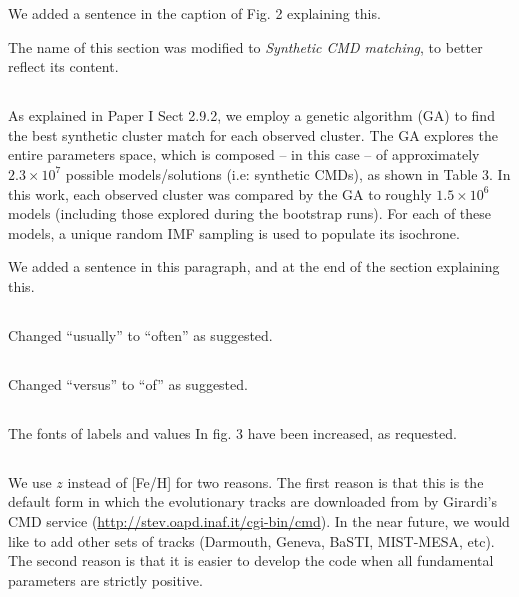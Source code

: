 \documentclass{article}
\begin{document}
We added a sentence in the caption of Fig. 2 explaining this.

The name of this section was modified to \emph{Synthetic CMD matching}, to
better reflect its content.

\subsection{}
As explained in Paper I Sect 2.9.2, we employ a genetic algorithm (GA) to
find the best synthetic cluster match for each observed cluster. The GA explores
the entire parameters space, which is composed -- in this case -- of
approximately $2.3\times10^7$ possible models/solutions (i.e: synthetic CMDs),
as shown in Table 3.
In this work, each observed cluster was compared by the GA to roughly
$1.5\times10^6$ models (including those explored during the bootstrap
runs). For each of these models, a unique random IMF sampling is
used to populate its isochrone. 

We added a sentence in this paragraph, and at the end of the section explaining
this.

\subsection{}
Changed ``usually'' to ``often'' as suggested.

\subsection{}
Changed ``versus'' to ``of'' as suggested.

\subsection{}
The fonts of labels and values In fig. 3 have been increased, as requested.

\subsection{}
We use $z$ instead of [Fe/H] for two reasons.
The first reason is that this is the default form in which the evolutionary
tracks are downloaded from by Girardi's CMD service 
(\url{http://stev.oapd.inaf.it/cgi-bin/cmd}).
In the near future, we would like to add other sets of tracks (Darmouth,
Geneva, BaSTI, MIST-MESA, etc).
The second reason is that it is easier to develop the code when all
fundamental parameters are strictly positive.
\end{document}
